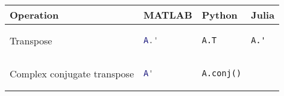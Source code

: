 \begin{tabular}[]{@{}llll@{}}
\toprule
\begin{minipage}[b]{0.24\columnwidth}\raggedright
Operation
\end{minipage} & \begin{minipage}[b]{0.23\columnwidth}\raggedright
MATLAB
\end{minipage} & \begin{minipage}[b]{0.20\columnwidth}\raggedright
Python
\end{minipage} & \begin{minipage}[b]{0.20\columnwidth}\raggedright
Julia
\end{minipage}\tabularnewline
\midrule
\begin{minipage}[t]{0.24\columnwidth}\raggedright
Transpose
\end{minipage} & \begin{minipage}[t]{0.23\columnwidth}\raggedright
\begin{lstlisting}[language=Matlab]
A.'
\end{lstlisting}

\end{minipage} & \begin{minipage}[t]{0.20\columnwidth}\raggedright
\begin{lstlisting}[language=Python]
A.T
\end{lstlisting}

\end{minipage} & \begin{minipage}[t]{0.20\columnwidth}\raggedright
\begin{lstlisting}
A.'
\end{lstlisting}

\end{minipage}\tabularnewline
\begin{minipage}[t]{0.24\columnwidth}\raggedright
Complex conjugate transpose
\end{minipage} & \begin{minipage}[t]{0.23\columnwidth}\raggedright
\begin{lstlisting}[language=Matlab]
A'
\end{lstlisting}

\end{minipage} & \begin{minipage}[t]{0.20\columnwidth}\raggedright
\begin{lstlisting}[language=Python]
A.conj()
\end{lstlisting}


\end{minipage}
\end{tabular}
